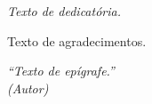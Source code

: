 \documentclass[
    12pt,               %
    openright,          %
    oneside,            %
    a4paper,            %
    english,            %
    french,             %
    spanish,            %
    brazil              %
    ]{abntex2}
\begin{document}
\frenchspacing 


\imprimircapa

\imprimirfolhaderosto*


%
%     


%
% 
%

\newpage
\begin{dedicatoria}
   \vspace*{\fill}
   \centering
   \noindent
   \textit{Texto de dedicatória.} \vspace*{\fill}   
\end{dedicatoria}

\begin{agradecimentos}

Texto de agradecimentos.

\end{agradecimentos}

\begin{epigrafe}
    \vspace*{\fill}
    \begin{flushright}
        \textit{ ``Texto de epígrafe.'' \\
        (Autor)}
    \end{flushright}
\end{epigrafe}
\end{document}
